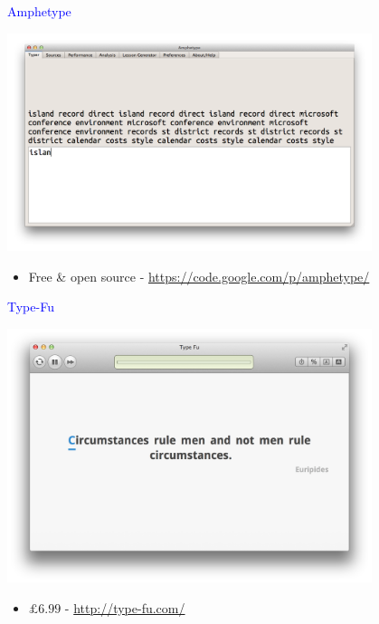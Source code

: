 \documentclass[landscape]{slides}
\begin{document}
\begin{slide}

    \textcolor{blue}{\Large{Amphetype}}

    \centering

    \includegraphics[width=0.8\textwidth]{amphetype-screenshot}

    \begin{itemize}
        \item Free \& open source - \url{https://code.google.com/p/amphetype/}
    \end{itemize}

\end{slide}


\begin{slide}

    \textcolor{blue}{\Large{Type-Fu}}

    \centering

    \includegraphics[width=0.8\textwidth]{type-fu-screenshot}

    \begin{itemize}
        \item $\pounds6.99$ - \url{http://type-fu.com/}
    \end{itemize}

\end{slide}
\end{document}
